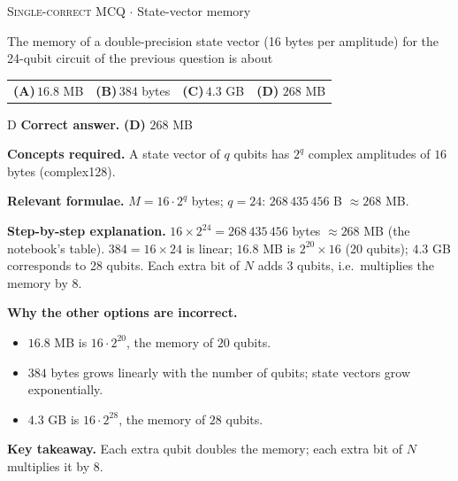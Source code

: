 \documentclass[11pt,a4paper]{article}
\newcommand{\optlabel}[1]{\textbf{(#1)}}
\newcommand{\correctlabel}[1]{\textcolor{okgreen}{\textbf{(#1)}\,\ding{51}}}
\newenvironment{qitem}[1]{\begin{list}{}{\setlength{\leftmargin}{3.3em}\setlength{\labelwidth}{3.1em}%
  \setlength{\labelsep}{0.2em}\setlength{\topsep}{3pt}\setlength{\parsep}{3pt}}\item[\textbf{Q.#1}\hfill]}{\end{list}}
\newcommand{\qsep}{\par\vspace{2pt}{\color{black!15}\hrule}\vspace{4pt}}
\newcommand{\qmeta}[2]{{\footnotesize\color{black!60}\textsc{#1} \;$\cdot$\; #2}\par}
\begin{document}
\begin{qitem}{34}
\qmeta{Single-correct MCQ}{State-vector memory}
The memory of a double-precision state vector (16 bytes per amplitude) for the 24-qubit circuit of the previous question is about
\par\smallskip\noindent\begin{tabularx}{\linewidth}{@{}*{4}{L}@{}}
\optlabel{A}\,$16.8$ MB & \optlabel{B}\,$384$ bytes & \optlabel{C}\,$4.3$ GB & \correctlabel{D}\,$268$ MB
\end{tabularx}
\end{qitem}
\begin{solbox}{D}
\textbf{\color{brand}Correct answer.} \textcolor{okgreen}{\textbf{(D)}} $268$ MB

\textbf{\color{brand}Concepts required.} A state vector of $q$ qubits has $2^q$ complex amplitudes of $16$ bytes (complex128).

\textbf{\color{brand}Relevant formulae.} $M = 16\cdot2^q$ bytes; $q = 24$: $268\,435\,456$ B $\approx 268$ MB.

\textbf{\color{brand}Step-by-step explanation.} $16\times2^{24} = 268\,435\,456$ bytes $\approx 268$ MB (the notebook's table). $384 = 16\times24$ is linear; $16.8$ MB is $2^{20}\times16$ (20 qubits);
$4.3$ GB corresponds to 28 qubits. Each extra bit of $N$ adds 3 qubits, i.e.\ multiplies the memory by 8.

\textbf{\color{brand}Why the other options are incorrect.}
\begin{itemize}[leftmargin=2.4em, itemsep=1pt, topsep=2pt]
\item[\textbf{(A)}] $16.8$ MB is $16\cdot2^{20}$, the memory of $20$ qubits.
\item[\textbf{(B)}] $384$ bytes grows linearly with the number of qubits; state vectors grow exponentially.
\item[\textbf{(C)}] $4.3$ GB is $16\cdot2^{28}$, the memory of $28$ qubits.
\end{itemize}
\textbf{\color{brand}Key takeaway.} Each extra qubit doubles the memory; each extra bit of $N$ multiplies it by $8$.
\end{solbox}
\qsep
\end{document}
